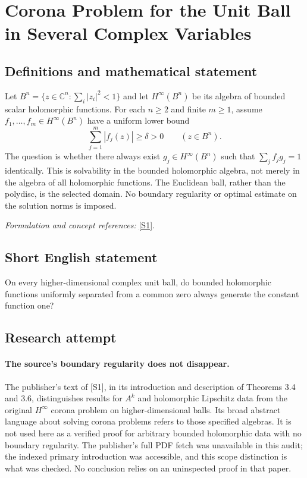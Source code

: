 \documentclass[11pt]{article}
\begin{document}
\section*{\texorpdfstring{Corona Problem for the Unit Ball in Several Complex Variables}{Corona Problem for the Unit Ball in Several Complex Variables}}\label{371}
\subsection{Definitions and mathematical statement}
Let $B^n=\{z\in{\mathbb{C}}^n:\sum_i|z_i|^2<1\}$ and let $H^\infty(B^n)$ be its algebra of bounded scalar holomorphic functions. For each $n\ge2$ and finite $m\ge1$, assume $f_1,\ldots,f_m\in H^\infty(B^n)$ have a uniform lower bound
\[
 \sum_{j=1}^m|f_j(z)|\ge\delta>0\qquad(z\in B^n).
\]
The question is whether there always exist $g_j\in H^\infty(B^n)$ such that $\sum_j f_jg_j=1$ identically. This is solvability in the bounded holomorphic algebra, not merely in the algebra of all holomorphic functions. The Euclidean ball, rather than the polydisc, is the selected domain. No boundary regularity or optimal estimate on the solution norms is imposed.
\par\smallskip\textit{Formulation and concept references:} \href{https://revista-em.unex.es/index.php/EM/article/download/2411/2144/7535}{[S1]}.

\subsection{Short English statement}
On every higher-dimensional complex unit ball, do bounded holomorphic functions uniformly separated from a common zero always generate the constant function one?
\subsection{Research attempt}
\paragraph{The source's boundary regularity does not disappear.}
The publisher's text of [S1], in its introduction and description
of Theorems 3.4 and 3.6, distinguishes results for $A^k$ and
holomorphic Lipschitz data from the original $H^\infty$ corona
problem on higher-dimensional balls. Its broad abstract language
about solving corona problems refers to those specified algebras.
It is not used here as a verified proof for arbitrary bounded
holomorphic data with no boundary regularity. The publisher's full
PDF fetch was unavailable in this audit; the indexed primary
introduction was accessible, and this scope distinction is what
was checked. No conclusion relies on an uninspected proof in that
paper.
\end{document}

